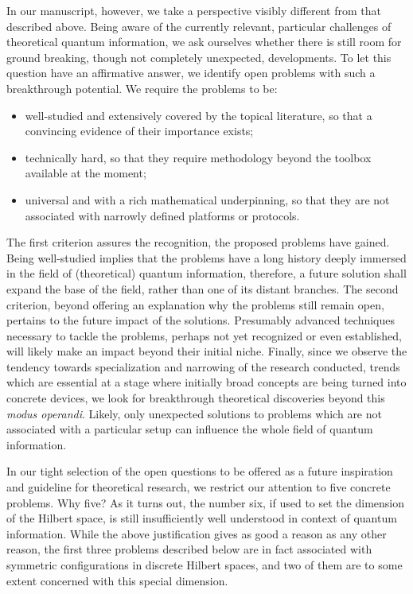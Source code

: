 \documentclass[english,aps,pra,nofootinbib,twocolumn,superscriptaddress]{revtex4-1}
\newcommand{\1}{{\rm 1\hspace{-0.9mm}l}}
\begin{document}
In our manuscript, however, we take a perspective visibly different from that described above. Being aware of the currently relevant, particular challenges of theoretical quantum information, we ask ourselves whether there is still room for ground breaking, though not completely unexpected, developments. To let this question have an affirmative answer, we identify open problems with such a breakthrough  potential. We require the problems to be:
\begin{itemize}  
\item  well-studied and extensively covered by the topical literature,
so that a convincing evidence of their importance exists;
\item technically hard, so that they require methodology beyond the toolbox available at the moment;
\item universal and with a rich mathematical underpinning, so that they are not associated with narrowly defined platforms or protocols.  
\end{itemize}  
The first criterion assures the recognition, the proposed problems have gained. Being well-studied implies that the problems have a long history deeply immersed in the field of (theoretical) quantum information, therefore, a future solution shall expand the base of the field, rather than one of its distant branches. The second criterion, beyond offering an explanation why the problems still remain open, pertains to the future impact of the solutions. Presumably advanced techniques necessary to tackle the problems, perhaps not yet recognized or even established, will likely make an impact beyond their initial niche. Finally, since we observe the tendency towards specialization and narrowing of the research conducted, trends which are essential at a stage where initially broad concepts are being turned into concrete devices, we look for breakthrough theoretical discoveries beyond this \textit{modus operandi}. Likely, only unexpected solutions to problems which are not associated with a particular setup can influence the whole field of quantum information.

In our tight selection of the open questions to be offered as a future inspiration and guideline for theoretical research, we restrict our attention to five concrete problems. 
Why five? 
 As it turns out, the number six,  if used to set the dimension of the Hilbert space, 
 is still insufficiently well understood in context of quantum information.
While the above
 justification gives as good a reason as any other reason, the first three problems described below are in fact associated with symmetric configurations in discrete Hilbert spaces, 
 and two of them are to some extent concerned with this special dimension. 
\end{document}
